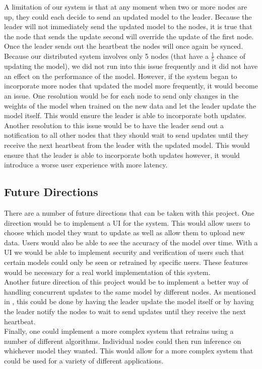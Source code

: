 \documentclass{article}
\begin{document}
A limitation of our system is that at any moment when two or more nodes are up, they could each decide to send an updated model to the leader. Because the leader will not immediately send the updated model to the nodes, it is true that the node that sends the update second will override the update of the first node. Once the leader sends out the heartbeat the nodes will once again be synced. Because our distributed system involves only 5 nodes (that have a $\frac{1}{5}$ chance of updating the model), we did not run into this issue frequently and it did not have an effect on the performance of the model. However, if the system began to incorporate more nodes that updated the model more frequently, it would become an issue. One resolution would be for each node to send only changes in the weights of the model when trained on the new data and let the leader update the model itself. This would ensure the leader is able to incorporate both updates. Another resolution to this issue would be to have the leader send out a notification to all other nodes that they should wait to send updates until they receive the next heartbeat from the leader with the updated model. This would ensure that the leader is able to incorporate both updates however, it would introduce a worse user experience with more latency. 


\subsection{Future Directions}
There are a number of future directions that can be taken with this project. One direction would be to implement a UI for the system. This would allow users to choose which model they want to update as well as allow them to upload new data. Users would also be able to see the accuracy of the model over time. With a UI we would be able to implement security and verification of users such that certain models could only be seen or retrained by specific users. These features would be necessary for a real world implementation of this system.
\\
Another future direction of this project would be to implement a better way of handling concurrent updates to the same model by different nodes. As mentioned in , this could be done by having the leader update the model itself or by having the leader notify the nodes to wait to send updates until they receive the next heartbeat. 
\\
Finally, one could implement a more complex system that retrains using a number of different algorithms. Individual nodes could then run inference on whichever model they wanted. This would allow for a more complex system that could be used for a variety of different applications. 
\end{document}
